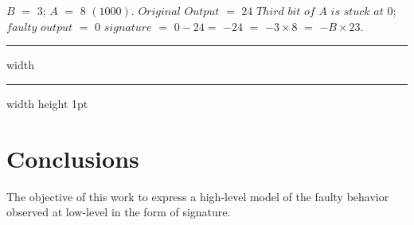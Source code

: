 $B$ $=$ $3$;  $A$ $=$ $8$ $(1000)$. 
$Original$ $Output$ $=$ $24$ 
$Third$ $bit$ $of$ $A$ $is$ $stuck$ $at$ $0$;  $faulty$ $output$ $=$ $0$ 
$signature$ $=$ $ 0 - 24 $$=$ $-24$ $=$ $-3\times 8$ $=$ $-B \times 23$.


\hrule height 2pt width \hsize \kern 1pt \hrule width \hsize height 1pt





\section{Conclusions}
The objective of this work to express a high-level model of the faulty behavior observed at low-level in the form of signature. 
